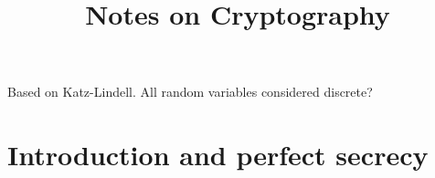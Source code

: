 \documentclass[twoside, a4paper, 10pt]{amsart}
\title[ ]{Notes on Cryptography}
\begin{document}
\maketitle
\raggedbottom


\newcommand{\cA}{\mathcal{A}}
\newcommand{\cB}{\mathcal{B}}
\newcommand{\cC}{\mathcal{C}}
\newcommand{\cD}{\mathcal{D}}
\newcommand{\cE}{\mathcal{E}}
\newcommand{\cF}{\mathcal{F}}
\newcommand{\cG}{\mathcal{G}}
\newcommand{\cH}{\mathcal{H}}
\newcommand{\cI}{\mathcal{I}}
\newcommand{\cJ}{\mathcal{J}}
\newcommand{\cK}{\mathcal{K}}
\newcommand{\cL}{\mathcal{L}}
\newcommand{\cM}{\mathcal{M}}
\newcommand{\cN}{\mathcal{N}}
\newcommand{\cO}{\mathcal{O}}
\newcommand{\cP}{\mathcal{P}}
\newcommand{\cQ}{\mathcal{Q}}
\newcommand{\cR}{\mathcal{R}}
\newcommand{\cS}{\mathcal{S}}
\newcommand{\cT}{\mathcal{T}}
\newcommand{\cU}{\mathcal{U}}
\newcommand{\cV}{\mathcal{V}}
\newcommand{\cW}{\mathcal{W}}
\newcommand{\cX}{\mathcal{X}}
\newcommand{\cY}{\mathcal{Y}}
\newcommand{\cZ}{\mathcal{Z}}
\newcommand{\bA}{\mathbb{A}}
\newcommand{\bB}{\mathbb{B}}
\newcommand{\bC}{\mathbb{C}}
\newcommand{\bD}{\mathbb{D}}
\newcommand{\bE}{\mathbb{E}}
\newcommand{\bF}{\mathbb{F}}
\newcommand{\bG}{\mathbb{G}}
\newcommand{\bH}{\mathbb{H}}
\newcommand{\bI}{\mathbb{I}}
\newcommand{\bJ}{\mathbb{J}}
\newcommand{\bK}{\mathbb{K}}
\newcommand{\bL}{\mathbb{L}}
\newcommand{\bM}{\mathbb{M}}
\newcommand{\bN}{\mathbb{N}}
\newcommand{\bO}{\mathbb{O}}
\newcommand{\bP}{\mathbb{P}}
\newcommand{\bQ}{\mathbb{Q}}
\newcommand{\bR}{\mathbb{R}}
\newcommand{\bS}{\mathbb{S}}
\newcommand{\bT}{\mathbb{T}}
\newcommand{\bU}{\mathbb{U}}
\newcommand{\bV}{\mathbb{V}}
\newcommand{\bW}{\mathbb{W}}
\newcommand{\bX}{\mathbb{X}}
\newcommand{\bY}{\mathbb{Y}}
\newcommand{\bZ}{\mathbb{Z}}


 

\theoremstyle{definition}
\newtheorem{mydef}[dummy]{Definition}
\newtheorem{prop}[dummy]{Proposition}
\newtheorem{corol}[dummy]{Corollary}
\newtheorem{thm}[dummy]{Theorem}
\newtheorem{lemma}[dummy]{Lemma}
\newtheorem{eg}[dummy]{Example}
\newtheorem{notation}[dummy]{Notation}
\newtheorem{remark}[dummy]{Remark}
\newtheorem{claim}[dummy]{Claim}
\newtheorem{Exercise}[dummy]{Exercise}
\newtheorem{question}[dummy]{Question}
\newtheorem{conjecture}[dummy]{Conjecture}


Based on Katz-Lindell. All random variables considered discrete?

\section{Introduction and perfect secrecy}
\end{document}
